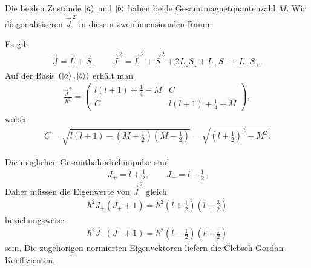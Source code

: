 \documentclass[11pt,a4paper]{scrartcl}
\begin{document}
    \begin{calculationbox}
        Die beiden Zustände $\ket a$ und $\ket b$ haben beide Gesamtmagnetquantenzahl $M$. Wir diagonalisiseren $\vec J^{\,2}$ in diesem zweidimensionalen Raum.

        \begin{calculationbox}[title=Matrix von $\vec J^{\,2}$ in der Produktbasis]
            Es gilt
            \begin{align*}
                \vec J=\vec L+\vec S,
                \qquad
                \vec J^{\,2}=\vec L^{\,2}+\vec S^{\,2}+2L_zS_z+L_+S_-+L_-S_+.
            \end{align*}
            Auf der Basis $(\ket a,\ket b)$ erhält man
            \begin{align*}
                \frac{\vec J^{\,2}}{\hbar^2}
                =
                \begin{pmatrix}
                    l(l+1)+\frac14-M & C\\
                    C & l(l+1)+\frac14+M
                \end{pmatrix},
            \end{align*}
            wobei
            \begin{align*}
                C
                =
                \sqrt{l(l+1)-\left(M+\frac12\right)\left(M-\frac12\right)}
                =
                \sqrt{\left(l+\frac12\right)^2-M^2}.
            \end{align*}
        \end{calculationbox}

        \begin{calculationbox}[title=Eigenwerte]
            Die möglichen Gesamtbahndrehimpulse sind
            \begin{align*}
                J_+=l+\frac12,
                \qquad
                J_-=l-\frac12.
            \end{align*}
            Daher müssen die Eigenwerte von $\vec J^{\,2}$ gleich
            \begin{align*}
                \hbar^2J_+(J_++1)
                =
                \hbar^2\left(l+\frac12\right)\left(l+\frac32\right)
            \end{align*}
            beziehungsweise
            \begin{align*}
                \hbar^2J_-(J_-+1)
                =
                \hbar^2\left(l-\frac12\right)\left(l+\frac12\right)
            \end{align*}
            sein. Die zugehörigen normierten Eigenvektoren liefern die Clebsch-Gordan-Koeffizienten.
        \end{calculationbox}


\end{calculationbox}
\end{document}
